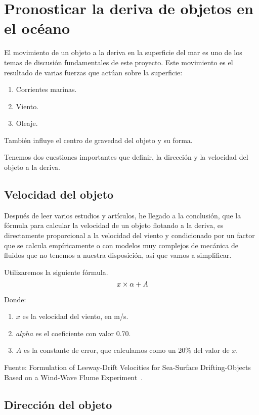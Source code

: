 \section{Pronosticar la deriva de objetos en el océano}

El movimiento de un objeto a la deriva en la superficie del mar es uno 
de los temas de discusión fundamentales de este proyecto. Este
 movimiento es el resultado de varias fuerzas que actúan sobre la superficie:

\begin{enumerate}
\item Corrientes marinas.
\item Viento.
\item Oleaje.
\end{enumerate}


También influye el centro de gravedad del objeto y su forma.

Tenemos dos cuestiones importantes que definir, la dirección 
y la velocidad del objeto a la deriva.

\subsection{Velocidad del objeto}

Después de leer varios estudios y artículos, he llegado a la
 conclusión, que la fórmula para calcular la velocidad de un objeto 
flotando a la deriva, es directamente proporcional a la velocidad
del viento y condicionado por un factor que se calcula empíricamente
 o con modelos muy complejos de mecánica de fluidos que no 
tenemos a nuestra disposición, así que vamos a simplificar.

Utilizaremos la siguiente fórmula.
\[\
   x \times \alpha + A \\  
\]

Donde:
\begin{enumerate}
\item $x$ es la velocidad del viento, en m/s.
\item $alpha$ es el coeficiente con valor 0.70.
\item $A$ es la constante de error, que calculamos como un 20\% del valor de $x$.
\end{enumerate}

Fuente: Formulation of Leeway-Drift Velocities for Sea-Surface
Drifting-Objects Based on a Wind-Wave Flume Experiment~\cite{VDERIVA}.



\subsection{Dirección del objeto}


